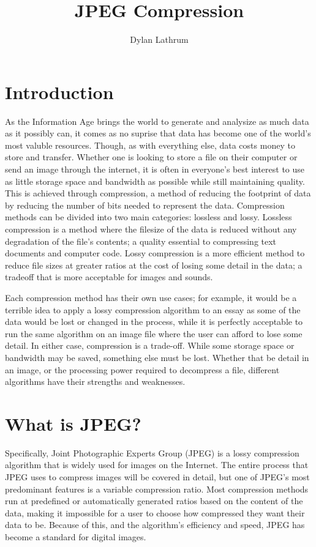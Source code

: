 \documentclass[11pt]{article}
\title{\vspace{-1.0cm}JPEG Compression}
\author{Dylan Lathrum}
\begin{document}
\maketitle

\section{Introduction}

As the Information Age brings the world to generate and analysize as much data as it possibly can, it comes as no suprise that data has become one of the world's most valuble resources. 
Though, as with everything else, data costs money to store and transfer.
Whether one is looking to store a file on their computer or send an image through the internet, it is often in everyone’s best interest to use as little storage space and bandwidth as possible while still maintaining quality.
This is achieved through compression, a method of reducing the footprint of data by reducing the number of bits needed to represent the data.
Compression methods can be divided into two main categories: lossless and lossy.
Lossless compression is a method where the filesize of the data is reduced without any degradation of the file’s contents; a quality essential to compressing text documents and computer code.
Lossy compression is a more efficient method to reduce file sizes at greater ratios at the cost of losing some detail in the data; a tradeoff that is more acceptable for images and sounds.

Each compression method has their own use cases; for example, it would be a terrible idea to apply a lossy compression algorithm to an essay as some of the data would be lost or changed in the process, while it is perfectly acceptable to run the same algorithm on an image file where the user can afford to lose some detail.
In either case, compression is a trade-off. While some storage space or bandwidth may be saved, something else must be lost.
Whether that be detail in an image, or the processing power required to decompress a file, different algorithms have their strengths and weaknesses.


\section{What is JPEG?}
\label{sec: whatisjpeg}

Specifically, Joint Photographic Experts Group (JPEG) is a lossy compression algorithm that is widely used for images on the Internet.
The entire process that JPEG uses to compress images will be covered in detail, but one of JPEG’s most predominant features is a variable compression ratio.
Most compression methods run at predefined or automatically generated ratios based on the content of the data, making it impossible for a user to choose how compressed they want their data to be.
Because of this, and the algorithm’s efficiency and speed, JPEG has become a standard for digital images.
\end{document}
